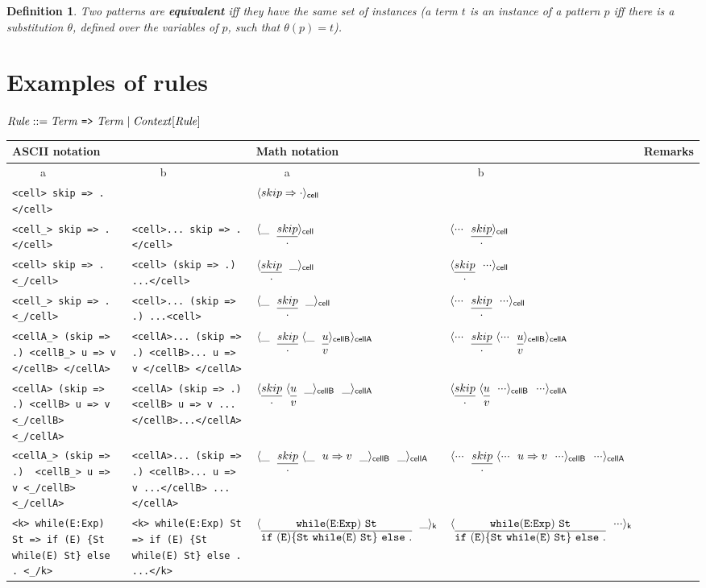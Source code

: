 \documentclass[draft]{article}
\makeatletter
\newcommand{\mall}[3]{\langle{#3}\rangle_{\sf #2}}
\newcommand{\mprefixa}[3]{\mall{#1}{#2}{{#3}\ \ \_}}
\newcommand{\mprefixb}[3]{\mall{#1}{#2}{{#3}\ \ {\cdot}{\cdot}{\cdot}}}
\newcommand{\msuffixa}[3]{\mall{#1}{#2}{\_\ \ {#3}}}
\newcommand{\msuffixb}[3]{\mall{#1}{#2}{{\cdot}{\cdot}{\cdot}\ \ {#3}}}
\newcommand{\mmiddlea}[3]{\mall{#1}{#2}{\_ \ \ {#3}\ \ \_}}
\newcommand{\mmiddleb}[3]{\mall{#1}{#2}{{\cdot}{\cdot}{\cdot} \ \ {#3}\ \ {\cdot}{\cdot}{\cdot}}}
\newcommand{\mdot}{\cdot}
\newcommand{\reduce}[2]{\begin{array}[t]{@{\extracolsep{0ex}}c@{\extracolsep{0ex}}}{#1}\\\hline{#2}\end{array}}
\newtheorem{definition}{Definition}
\makeatother
\begin{document}
\begin{definition}
Two patterns are \textbf{equivalent} iff they have the same set of instances (a term $t$ is an instance of a pattern $p$ iff there is a substitution $\theta$, defined over the variables of $p$, such that $\theta(p)=t$).
\end{definition}

\section{Examples of rules}

$\it Rule ::= Term ~\texttt{=>}~ Term \mid Context[Rule]$

\medskip

\noindent
\begin{tabular}{|l|l|l|l|l|}
\hline
\multicolumn{2}{|l|}{ASCII notation}
&
\multicolumn{2}{l|}{Math notation}
&
Remarks
\\
\hline
~~~~~a
&
~~~~~b
&
~~~~~a
&
~~~~~b
&
\\
\hline
\verb'<cell> skip => . </cell>'
&
&
$\mall{}{cell}{skip\Rightarrow\mdot}$
&
&
\\
\hline
\verb'<cell_> skip => . </cell>'
&
\verb'<cell>... skip => . </cell>'
&
$\msuffixa{}{cell}{\reduce{skip}{\mdot}}$
&
$\msuffixb{}{cell}{\reduce{skip}{\mdot}}$
&
\\
\hline
\verb'<cell> skip => . <_/cell>'
&
\verb'<cell> (skip => .) ...</cell>'
&
$\mprefixa{}{cell}{\reduce{skip}{\mdot}}$
&
$\mprefixb{}{cell}{\reduce{skip}{\mdot}}$
&
\\
\hline
\verb'<cell_> skip => . <_/cell>'
&
\verb'<cell>... (skip => .) ...<cell>'
&
$\mmiddlea{}{cell}{\reduce{skip}{\mdot}}$
&
$\mmiddleb{}{cell}{\reduce{skip}{\mdot}}$
&
\\
\hline
\verb'<cellA_> (skip => .) <cellB_> u => v </cellB> </cellA>'
&
\verb'<cellA>... (skip => .) <cellB>... u => v </cellB> </cellA>'
&
$\msuffixa{}{cellA}{\reduce{skip}{\mdot}~\msuffixa{}{cellB}{\reduce{u}{v}}}$
&
$\msuffixb{}{cellA}{\reduce{skip}{\mdot}~\msuffixb{}{cellB}{\reduce{u}{v}}}$
&
\\
\hline
\verb'<cellA> (skip => .) <cellB> u => v <_/cellB> <_/cellA>'
&
\verb'<cellA> (skip => .) <cellB> u => v ...</cellB>...</cellA>'
&
$\mprefixa{}{cellA}{\reduce{skip}{\mdot}~\mprefixa{}{cellB}{\reduce{u}{v}}}$
&
$\mprefixb{}{cellA}{\reduce{skip}{\mdot}~\mprefixb{}{cellB}{\reduce{u}{v}}}$
&
\\
\hline
\verb'<cellA_> (skip => .)  <cellB_> u => v <_/cellB><_/cellA>'
&
\verb'<cellA>... (skip => .) <cellB>... u => v ...</cellB> ...</cellA>'
&
$\mmiddlea{}{cellA}{\reduce{skip}{\mdot}~\mmiddlea{}{cellB}{u\Rightarrow v}}$
&
$\mmiddleb{}{cellA}{\reduce{skip}{\mdot}~\mmiddleb{}{cellB}{u\Rightarrow v}}$
&
\\
\hline
\verb'<k> while(E:Exp) St => if (E) {St while(E) St} else . <_/k>'
&
\verb'<k> while(E:Exp) St => if (E) {St while(E) St} else . ...</k>'
&
$\mprefixa{}{k}{\reduce{\tt while(E{:}Exp)~ St}{\tt if~(E) \{St~while(E)~St\}~else~.}}$
&
$\mprefixb{}{k}{\reduce{\tt while(E{:}Exp)~ St}{\tt if~(E) \{St~while(E)~St\}~else~.}}$
&
\\
\hline
\end{tabular}
\end{document}
